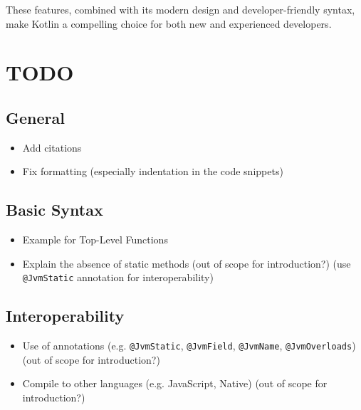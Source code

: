 \documentclass[a4paper,11pt]{article}
\begin{document}
These features, combined with its modern design and developer-friendly syntax, make Kotlin a compelling choice for both new and experienced developers.

\newpage
\printbibliography[]












\newpage
\section{TODO}

  \subsection{General}
    \begin{itemize}
      \item Add citations
      \item Fix formatting (especially indentation in the code snippets)
    \end{itemize}
    
  \subsection{Basic Syntax}
    \begin{itemize}
      \item Example for Top-Level Functions
      \item Explain the absence of static methods (out of scope for introduction?) (use \texttt{@JvmStatic} annotation for interoperability)
    \end{itemize}

  \subsection{Interoperability}
    \begin{itemize}
      \item Use of annotations (e.g. \texttt{@JvmStatic}, \texttt{@JvmField}, \texttt{@JvmName}, \texttt{@JvmOverloads}) (out of scope for introduction?)
      \item Compile to other languages (e.g. JavaScript, Native) (out of scope for introduction?)
    \end{itemize}
\end{document}
